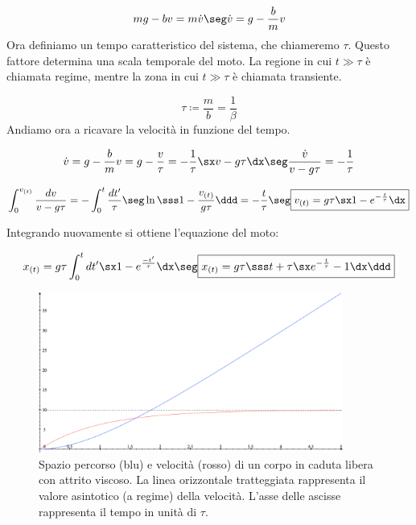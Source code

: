 \begin{equation}
mg - bv = m\dot v \seg \dot v = g - \frac{b}{m}v
\end{equation}
Ora definiamo un tempo caratteristico del sistema, che chiameremo $\tau$. Questo fattore determina una scala temporale del moto. La regione in cui $t\gg\tau$ è chiamata regime, mentre la zona in cui $t\gg\tau$ è chiamata transiente.

\begin{equation}
\boxed{\tau \coloneqq \frac{m}{b} = \frac1\beta}
\end{equation}
Andiamo ora a ricavare la velocità in funzione del tempo.

\begin{equation}
\dot v = g - \frac bmv = g - \frac v\tau = -\frac1\tau\sx v - g\tau\dx\seg \frac{\dot v}{v -g\tau} = -\frac1\tau
\end{equation}

\begin{equation}
\int_0^{v_{(t)}}\frac{d v}{v -g\tau} = -\int_0^t\frac{dt'}\tau\seg \ln\sss 1 - \frac{v_{(t)}}{g\tau}\ddd = -\frac t\tau\seg\boxed{v_{(t)} = g\tau\sx1-e^{-\frac t\tau}\dx}
\end{equation}

Integrando nuovamente si ottiene l'equazione del moto:

\begin{equation}
x_{(t)} = g\tau\int_0^tdt'\sx1-e^{\frac{-t'}\tau}\dx \seg\boxed{x_{(t)} = g\tau\sss t + \tau\sx e^{-\frac t\tau} - 1\dx\ddd}
\end{equation}

\begin{figure}[htbp]
\begin{center}
\includegraphics[width=10cm]{images/cadsmorzxv.png}
\caption{Spazio percorso (blu) e velocità (rosso) di un corpo in caduta libera con attrito viscoso. La linea orizzontale tratteggiata rappresenta il valore asintotico (a regime) della velocità. L'asse delle ascisse rappresenta il tempo in unità di $\tau$.}
\label{default}
\end{center}
\end{figure}

